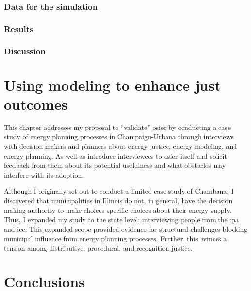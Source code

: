\subsection{Data for the simulation}

\subsection{Results}

\subsection{Discussion}

\chapter{Using modeling to enhance just outcomes}

This chapter addresses my proposal to ``validate'' \ac{osier} by conducting a
case study of energy planning processes in Champaign-Urbana through interviews
with decision makers and planners about energy justice, energy modeling, and
energy planning. As well as introduce interviewees to \ac{osier} itself and
solicit feedback from them about its potential usefulness and what obstacles may
interfere with its adoption. 

Although I originally set out to conduct a limited case study of Chambana, I
discovered that municipalities in Illinois do not, in general, have the decision
making authority to make choices specific choices about their energy supply.
Thus, I expanded my study to the state level; interviewing people from the
\ac{ipa} and \ac{icc}. This expanded scope provided evidence for structural
challenges blocking municipal influence from energy planning processes. Further,
this evinces a tension among distributive, procedural, and recognition justice.

\chapter{Conclusions}
